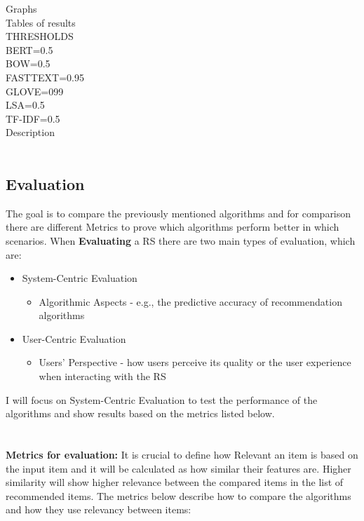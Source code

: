\documentclass[\myFontSize,a4paper,oneside,english,hidelinks]{article}
\begin{document}
Graphs\\
Tables of results\\
THRESHOLDS\\
BERT=0.5\\
BOW=0.5\\
FASTTEXT=0.95\\
GLOVE=099\\
LSA=0.5\\
TF-IDF=0.5\\
Description\\\\



\subsection{Evaluation}
The goal is to compare the previously mentioned algorithms and for comparison there are different Metrics to prove which algorithms perform better in which scenarios. When \textbf{Evaluating} a RS there are two main types of evaluation, which are:
\begin{itemize}
\item System-Centric Evaluation
	\begin{itemize}
	\item Algorithmic Aspects - e.g., the predictive accuracy of recommendation algorithms
	\end{itemize}

\item User-Centric Evaluation
	\begin{itemize}
	\item Users' Perspective - how users perceive its quality or the user experience when interacting with the RS
	\end{itemize}
\end{itemize}
%
%
I will focus on System-Centric Evaluation to test the performance of the algorithms and show results based on the metrics listed below.\\\\\\
%
%
\textbf{Metrics for evaluation:}
It is crucial to define how Relevant an item is based on the input item and it will be calculated as how similar their features are. Higher similarity will show higher relevance between the compared items in the list of recommended items. The metrics below describe how to compare the algorithms and how they use relevancy between items:
\end{document}
